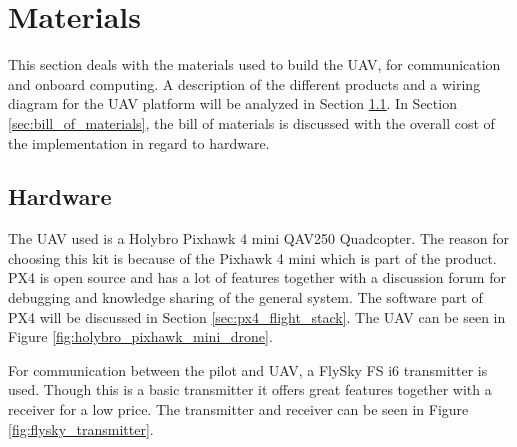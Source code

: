 \documentclass[../Head/report.tex]{subfiles}
\begin{document}


\lstset{style=mystyle}

\section{Materials}
This section deals with the materials used to build the UAV, for communication and onboard computing. A description of the different products and a wiring diagram for the UAV platform will be analyzed in Section \ref{sec:hardware}. In Section \ref{sec:bill_of_materials}, the bill of materials is discussed with the overall cost of the implementation in regard to hardware.   

\subsection{Hardware}
\label{sec:hardware}

The UAV used is a Holybro Pixhawk 4 mini QAV250 Quadcopter. The reason for choosing this kit is because of the Pixhawk 4 mini which is part of the product. PX4 is open source and has a lot of features together with a discussion forum for debugging and knowledge sharing of the general system. The software part of PX4 will be discussed in Section \ref{sec:px4_flight_stack}. The UAV can be seen in Figure \ref{fig:holybro_pixhawk_mini_drone}. 

For communication between the pilot and UAV, a FlySky FS i6 transmitter is used. Though this is a basic transmitter it offers great features together with a receiver for a low price. The transmitter and receiver can be seen in Figure \ref{fig:flysky_transmitter}. 
\end{document}
